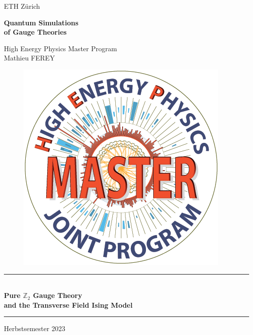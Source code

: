 \begin{titlepage}
    
    \begin{center}
        ETH Zürich
        
        \vspace{1cm}

        \Huge
        \textbf{Quantum Simulations\\\huge of Gauge Theories\\}
        
        \vspace{1.5cm}

        \Large
        High Energy Physics Master Program\\
        Mathieu FEREY 
        
        \begin{figure}[h]
            \centering 
            \includegraphics[scale=0.2]{Images/hep-logo.png}
        \end{figure}
        
        \rule{13cm}{0.5mm}
        \huge
        \textbf{\\Pure $\mathds{Z}_2$ Gauge Theory\\}
        \vspace{2mm}
        \Large
        \textbf{and the Transverse Field Ising Model\\}
        \rule{13cm}{0.5mm}
        
        \vspace{5mm}
        Herbstsemester 2023
        

\end{center}
\end{titlepage}
